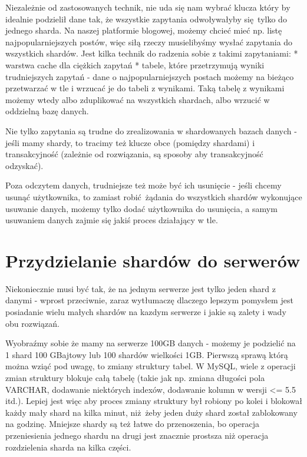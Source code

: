 \documentclass[a4paper,12pt]{article}
\begin{document}
Niezależnie od zastosowanych technik, nie uda się nam wybrać klucza który by idealnie podzielił dane tak, że wszystkie zapytania odwoływałyby się tylko do jednego sharda. Na naszej platformie blogowej, możemy chcieć mieć np. listę najpopularniejszych postów, więc siłą rzeczy musielibyśmy wysłać zapytania do wszystkich shardów. Jest kilka technik do radzenia sobie z takimi zapytaniami:
* warstwa cache dla ciężkich zapytań
* tabele, które przetrzymują wyniki trudniejszych zapytań - dane o najpopularniejszych postach możemy na bieżąco przetwarzać w tle i wrzucać je do tabeli z wynikami. Taką tabelę z wynikami możemy wtedy albo zduplikować na wszystkich shardach, albo wrzucić w oddzielną bazę danych.

Nie tylko zapytania są trudne do zrealizowania w shardowanych bazach danych - jeśli mamy shardy, to tracimy też klucze obce (pomiędzy shardami) i transakcyjność (zależnie od rozwiązania, są sposoby aby transakcyjność odzyskać).

Poza odczytem danych, trudniejsze też może być ich usunięcie - jeśli chcemy usunąć użytkownika, to zamiast robić żądania do wszystkich shardów wykonujące usuwanie danych, możemy tylko dodać użytkownika do usunięcia, a samym usuwaniem danych zajmie się jakiś proces działający w tle.

\section{Przydzielanie shardów do serwerów}

Niekoniecznie musi być tak, że na jednym serwerze jest tylko jeden shard z danymi - wprost przeciwnie, zaraz wytłumaczę dlaczego lepszym pomysłem jest posiadanie wielu małych shardów na kazdym serwerze i jakie są zalety i wady obu rozwiązań.

Wyobraźmy sobie że mamy na serwerze 100GB danych - możemy je podzielić na 1 shard 100 GBajtowy lub 100 shardów wielkości 1GB. Pierwszą sprawą którą można wziąć pod uwagę, to zmiany struktury tabel. W MySQL, wiele z operacji zmian struktury blokuje całą tabelę (takie jak np. zmiana długości pola VARCHAR, dodawanie niektórych indexów, dodawanie kolumn w wersji <= 5.5 itd.). Lepiej jest więc aby proces zmiany struktury był robiony po kolei i blokował każdy mały shard na kilka minut, niż żeby jeden duży shard został zablokowany na godzinę. Mniejsze shardy są też łatwe do przenoszenia, bo operacja przeniesienia jednego shardu na drugi jest znacznie prostsza niż operacja rozdzielenia sharda na kilka części.
\end{document}
